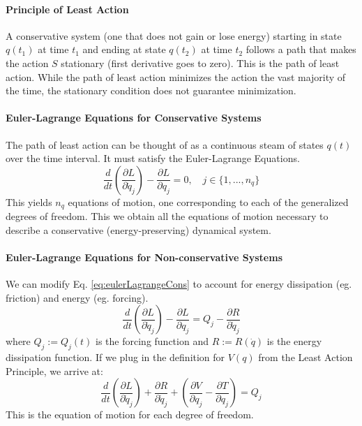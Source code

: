 \documentclass[../notes.tex]{subfiles}
\begin{document}
\paragraph{Principle of Least Action} A conservative system (one that does not gain or lose energy) starting in state $q(t_1)$ at time $t_1$ and ending at state $q(t_2)$ at time $t_2$ follows a path that makes the action $S$ stationary (first derivative goes to zero). This is the path of least action. While the path of least action minimizes the action the vast majority of the time, the stationary condition does not guarantee minimization.
\paragraph{Euler-Lagrange Equations for Conservative Systems} The path of least action can be thought of as a continuous steam of states $q(t)$ over the time interval. It must satisfy the Euler-Lagrange Equations.
\begin{equation} \label{eq:eulerLagrangeCons}
    \frac{d}{dt}(\frac{\partial L}{\partial \dot{q}_j}) - \frac{\partial L}{\partial q_j} = 0, \quad j \in \{1, ..., n_q\}
\end{equation}
This yields $n_q$ equations of motion, one corresponding to each of the generalized degrees of freedom. This we obtain all the equations of motion necessary to describe a conservative (energy-preserving) dynamical system.
\paragraph{Euler-Lagrange Equations for Non-conservative Systems} We can modify Eq. \ref{eq:eulerLagrangeCons} to account for energy dissipation (eg. friction) and energy (eg. forcing).
\begin{equation}
    \frac{d}{dt}(\frac{\partial L}{\partial \dot{q}_j}) - \frac{\partial L}{\partial q_j} = Q_j - \frac{\partial R}{\partial \dot{q}_j}
\end{equation}
where $Q_j := Q_j(t)$ is the forcing function and $R:=R(\dot{q})$ is the energy dissipation function. If we plug in the definition for $V(q)$ from the Least Action Principle, we arrive at:
\begin{equation} \label{eq:eulerLagrangeFull}
    \frac{d}{dt}(\frac{\partial L}{\partial \dot{q}_j}) + \frac{\partial R}{\partial \dot{q}_j} + (\frac{\partial V}{\partial q_j} - \frac{\partial T}{\partial q_j}) = Q_j
\end{equation}
This is the equation of motion for each degree of freedom.
\end{document}
